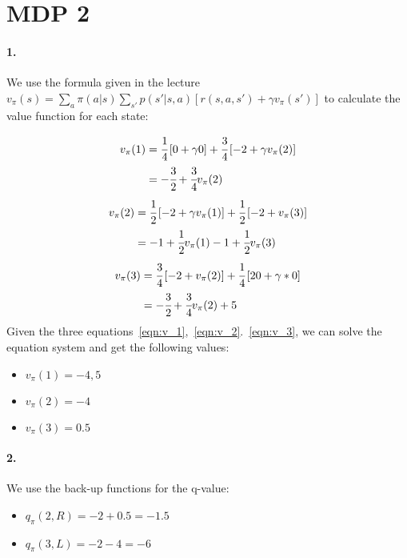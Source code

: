 \section{MDP 2}
\paragraph{1.}
We use the formula given in the lecture $v_\pi(s)=\sum\limits_a\pi(a|s)\sum\limits_{s'}p(s'|s,a)\left[r(s, a, s')+\gamma v_\pi(s')\right]$
to calculate the value function for each state:

\begin{align}
    \begin{split}
        v_\pi(1)&=\cfrac{1}{4}\left[0+\gamma 0\right]+\cfrac{3}{4}\left[-2+\gamma v_\pi(2)\right]\\
                &=-\cfrac{3}{2}+\cfrac{3}{4}v_\pi(2)
    \end{split}
    \label{eqn:v_1}
\end{align}
\begin{align}
    \begin{split}
        v_\pi(2)&=\cfrac{1}{2}\left[-2+\gamma v_\pi(1)\right]+\cfrac{1}{2}\left[-2+v_\pi(3)\right]\\
                &=-1+\cfrac{1}{2}v_\pi(1)-1+\cfrac{1}{2}v_\pi(3)   
    \end{split}
    \label{eqn:v_2}
\end{align}
\begin{align}
    \begin{split}
        v_\pi(3)&=\cfrac{3}{4}\left[-2+v_\pi(2)\right] + \cfrac{1}{4}\left[20+\gamma*0\right]\\
            &=-\cfrac{3}{2}+\cfrac{3}{4}v_\pi(2)+5
    \end{split}
    \label{eqn:v_3}
\end{align}
Given the three equations~\ref{eqn:v_1},~\ref{eqn:v_2}.~\ref{eqn:v_3},
we can solve the equation system and get the following values:
\begin{itemize}
    \item $v_\pi(1)=-4,5$
    \item $v_\pi(2)=-4$
    \item $v_\pi(3)=0.5$
\end{itemize}

\paragraph*{2.}
We use the back-up functions for the q-value:
\begin{itemize}
    \item $q_\pi(2, R)=-2+0.5=-1.5$
    \item $q_\pi(3, L)=-2-4=-6$
\end{itemize}

